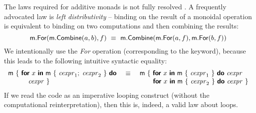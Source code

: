 \documentclass[runningheads,a4paper]{llncs}
\begin{document}
The laws required for additive monads is not fully resolved \cite{monadplus}. A frequently advocated
law is \emph{left distributivity} -- binding on the result of a monoidal operation is equivalent 
to binding on two computations and then combining the results:
%
\begin{equation*}
\textnormal{\sffamily m}.\textnormal{\sffamily For}(\textnormal{\sffamily m}.\textnormal{\sffamily Combine}(a, b), f)
~\equiv~
\textnormal{\sffamily m}.\textnormal{\sffamily Combine}(\textnormal{\sffamily m}.\textnormal{\sffamily For}(a, f), \textnormal{\sffamily m}.\textnormal{\sffamily For}(b, f))
\end{equation*}
%
We intentionally use the \emph{For} operation (corresponding to the  keyword), because
this leads to the following intuitive syntactic equality:
%
\begin{equation*}
\begin{array}{l}
\textnormal{\sffamily m}~\{~  \textnormal{\bfseries\sffamily for}~x~\textnormal{\bfseries\sffamily in}~\textnormal{\sffamily m}~\{~\textnormal{\emph{cexpr}}_1;\;\textnormal{\emph{cexpr}}_2~\}~\textnormal{\bfseries\sffamily do}\\
\hspace{2.0em}\quad \textnormal{\emph{cexpr}}~\}
\end{array}~
\begin{array}{c}\equiv\\~\end{array}~
\begin{array}{l}
\textnormal{\sffamily m}~\{~ \textnormal{\bfseries\sffamily for}~x~\textnormal{\bfseries\sffamily in}~\textnormal{\sffamily m}~\{~\textnormal{\emph{cexpr}}_1~\}~\textnormal{\bfseries\sffamily do}~\textnormal{\emph{cexpr}} \\
\hspace{2em}  \textnormal{\bfseries\sffamily for}~x~\textnormal{\bfseries\sffamily in}~\textnormal{\sffamily m}~\{~\textnormal{\emph{cexpr}}_2~\}~\textnormal{\bfseries\sffamily do}~\textnormal{\emph{cexpr}}~\}
\end{array}
\end{equation*}
%
If we read the code as an imperative looping construct (without the computational reinterpretation),
then this is, indeed, a valid law about  loops.
\end{document}
